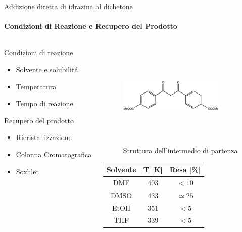 \documentclass{beamer}
\begin{document}
\begin{frame}{Addizione diretta di idrazina al dichetone}
	\framesubtitle{Condizioni di Reazione e Recupero del Prodotto}
	\begin{columns}
		\hspace{1cm}
		\begin{column}{0.5\textwidth}
			Condizioni di reazione
			\begin{itemize}
				\item Solvente e solubilitá
				\item Temperatura
				\item Tempo di reazione
			\end{itemize}
			\vspace{0.2cm}
			Recupero del prodotto
			\begin{itemize}
				\item Ricristallizzazione
				\item Colonna Cromatografica
				\item Soxhlet
			\end{itemize}
		\end{column}
		\hspace{-3cm}
		\begin{column}{0.5\textwidth}
			\vspace{-0.5cm}
			\begin{figure}[h!]
				\centering
				\includegraphics[width=5cm,height=5cm,keepaspectratio]{../Structures/dikest2.eps}
				\caption{Struttura dell'intermedio di partenza}
			\end{figure}
			\begin{footnotesize}
				\begin{center}
					\begin{tabular}{ccc}
						\toprule
						{Solvente} & T [K] & Resa [\%]     \\
						\midrule
						DMF        & 403   & \(< 10\)      \\
						DMSO       & 433   & \(\simeq 25\) \\
						EtOH       & 351   & \(< 5\)       \\
						THF        & 339   & \(< 5\)       \\
						\bottomrule
					\end{tabular}
				\end{center}
			\end{footnotesize}
		\end{column}
	\end{columns}
\end{frame}
\end{document}
